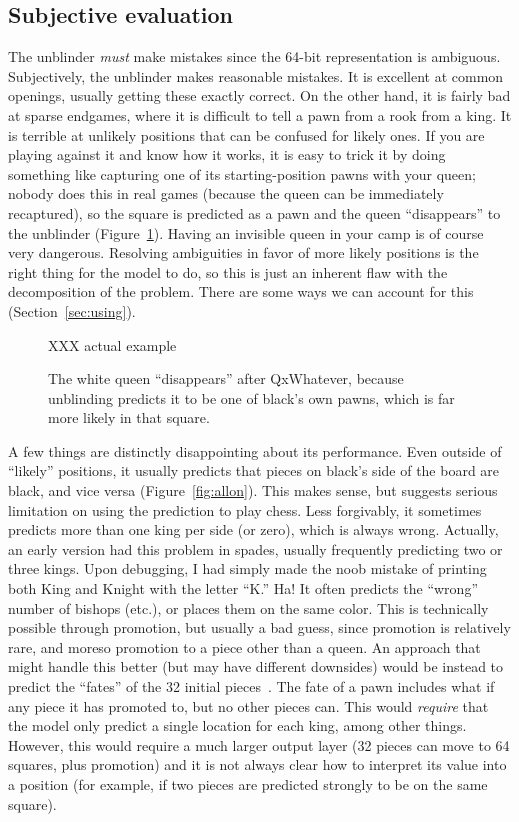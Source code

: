 \documentclass[twocolumn]{amsart}
\begin{document}
\subsection{Subjective evaluation}

The unblinder {\em must} make mistakes since the 64-bit representation
is ambiguous. Subjectively, the unblinder makes reasonable mistakes.
It is excellent at common openings, usually getting these exactly
correct. On the other hand, it is fairly bad at sparse endgames, where
it is difficult to tell a pawn from a rook from a king. It is terrible
at unlikely positions that can be confused for likely ones. If you are
playing against it and know how it works, it is easy to trick it by
doing something like capturing one of its starting-position pawns with
your queen; nobody does this in real games (because the queen can be
immediately recaptured), so the square is predicted as a pawn and the
queen ``disappears'' to the unblinder (Figure~\ref{fig:trick}). Having
an invisible queen in your camp is of course very dangerous. Resolving
ambiguities in favor of more likely positions is the right thing for
the model to do, so this is just an inherent flaw with the
decomposition of the problem. There are some ways we can account for
this (Section~\ref{sec:using}). %

\begin{figure}[ht]
XXX actual example
\caption{The white queen ``disappears'' after QxWhatever, because
  unblinding predicts it to be one of black's own pawns, which is far
  more likely in that square.} \label{fig:trick}
\end{figure}

A few things are distinctly disappointing about its performance. Even
outside of ``likely'' positions, it usually predicts that pieces on
black's side of the board are black, and vice versa
(Figure~\ref{fig:allon}). This makes sense, but suggests serious
limitation on using the prediction to play chess. Less forgivably, it
sometimes predicts more than one king per side (or zero), which is
always wrong. Actually, an early version had this problem in spades,
usually frequently predicting two or three kings. Upon debugging, I
had simply made the noob mistake of printing both King and Knight with
the letter ``K.'' Ha! It often predicts the ``wrong'' number of
bishops (etc.), or places them on the same color. This is technically
possible through promotion, but usually a bad guess, since promotion
is relatively rare, and moreso promotion to a piece other than a
queen. An approach that might handle this better (but may have
different downsides) would be instead to predict the ``fates'' of the
32 initial pieces~\cite{survival}. The fate of a pawn includes what if
any piece it has promoted to, but no other pieces can. This would {\em
  require} that the model only predict a single location for each
king, among other things. However, this would require a much larger
output layer (32 pieces can move to 64 squares, plus promotion) and it
is not always clear how to interpret its value into a position (for
example, if two pieces are predicted strongly to be on the same
square).
\end{document}
